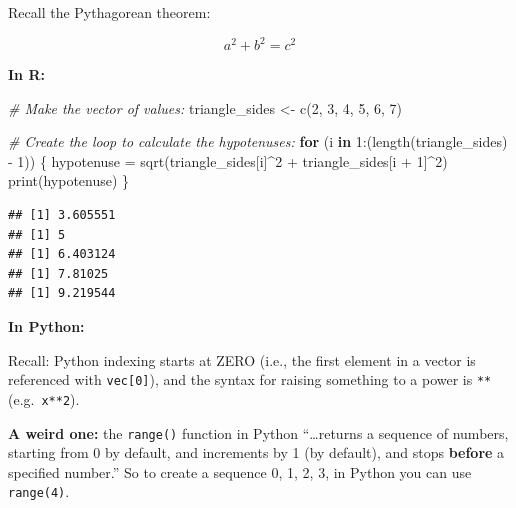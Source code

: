 \documentclass[
]{book}
\newenvironment{Shaded}{\begin{snugshade}}{\end{snugshade}}
\newcommand{\CommentTok}[1]{\textcolor[rgb]{0.56,0.35,0.01}{\textit{#1}}}
\newcommand{\ControlFlowTok}[1]{\textcolor[rgb]{0.13,0.29,0.53}{\textbf{#1}}}
\newcommand{\DecValTok}[1]{\textcolor[rgb]{0.00,0.00,0.81}{#1}}
\newcommand{\FunctionTok}[1]{\textcolor[rgb]{0.00,0.00,0.00}{#1}}
\newcommand{\NormalTok}[1]{#1}
\newcommand{\OtherTok}[1]{\textcolor[rgb]{0.56,0.35,0.01}{#1}}
\newcommand{\SpecialCharTok}[1]{\textcolor[rgb]{0.00,0.00,0.00}{#1}}
\begin{document}
Recall the Pythagorean theorem:

\[a^2 + b^2 = c^2\]

\textbf{In R:}

\begin{Shaded}
\begin{Highlighting}[]
\CommentTok{\# Make the vector of values: }
\NormalTok{triangle\_sides }\OtherTok{\textless{}{-}} \FunctionTok{c}\NormalTok{(}\DecValTok{2}\NormalTok{, }\DecValTok{3}\NormalTok{, }\DecValTok{4}\NormalTok{, }\DecValTok{5}\NormalTok{, }\DecValTok{6}\NormalTok{, }\DecValTok{7}\NormalTok{)}

\CommentTok{\# Create the loop to calculate the hypotenuses: }
\ControlFlowTok{for}\NormalTok{ (i }\ControlFlowTok{in} \DecValTok{1}\SpecialCharTok{:}\NormalTok{(}\FunctionTok{length}\NormalTok{(triangle\_sides) }\SpecialCharTok{{-}} \DecValTok{1}\NormalTok{)) \{}
\NormalTok{  hypotenuse }\OtherTok{=} \FunctionTok{sqrt}\NormalTok{(triangle\_sides[i]}\SpecialCharTok{\^{}}\DecValTok{2} \SpecialCharTok{+}\NormalTok{ triangle\_sides[i }\SpecialCharTok{+} \DecValTok{1}\NormalTok{]}\SpecialCharTok{\^{}}\DecValTok{2}\NormalTok{)}
  \FunctionTok{print}\NormalTok{(hypotenuse)}
\NormalTok{\}}
\end{Highlighting}
\end{Shaded}

\begin{verbatim}
## [1] 3.605551
## [1] 5
## [1] 6.403124
## [1] 7.81025
## [1] 9.219544
\end{verbatim}

\textbf{In Python:}

Recall: Python indexing starts at ZERO (i.e., the first element in a vector is referenced with \texttt{vec{[}0{]}}), and the syntax for raising something to a power is \texttt{**} (e.g.~\texttt{x**2}).

\textbf{A weird one:} the \texttt{range()} function in Python ``\ldots returns a sequence of numbers, starting from 0 by default, and increments by 1 (by default), and stops \textbf{before} a specified number.'' So to create a sequence 0, 1, 2, 3, in Python you can use \texttt{range(4)}.
\end{document}
